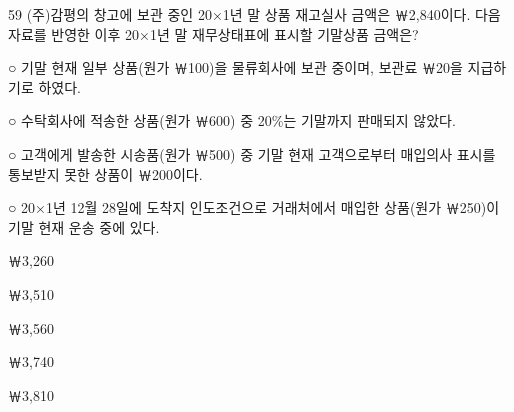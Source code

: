 \begin{question}{59}
(주)감평의 창고에 보관 중인 20×1년 말 상품 재고실사 금액은 ￦2,840이다. 다음 자료를 반영한 이후 20×1년 말 재무상태표에 표시할 기말상품 금액은?
\begin{framedtext}
○ 기말 현재 일부 상품(원가 ￦100)을 물류회사에 보관 중이며, 보관료 ￦20을 지급하기로 하였다. \par
○ 수탁회사에 적송한 상품(원가 ￦600) 중 20\%는 기말까지 판매되지 않았다. \par
○ 고객에게 발송한 시송품(원가 ￦500) 중 기말 현재 고객으로부터 매입의사 표시를 통보받지 못한 상품이 ￦200이다. \par
○ 20×1년 12월 28일에 도착지 인도조건으로 거래처에서 매입한 상품(원가 ￦250)이 기말 현재 운송 중에 있다. \par
\end{framedtext}
\begin{choices}
  \item ￦3,260
  \item ￦3,510
  \item ￦3,560
  \item ￦3,740
  \item ￦3,810
\end{choices}
\end{question}
